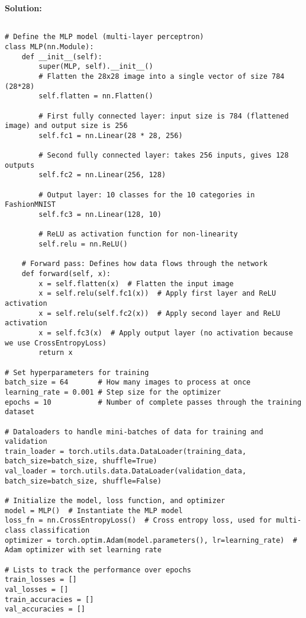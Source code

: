 \documentclass{article}
\newenvironment{solution}{\color{blue} \smallskip \textbf{Solution:}}{}
\begin{document}
\begin{solution}
\begin{verbatim}

# Define the MLP model (multi-layer perceptron)
class MLP(nn.Module):
    def __init__(self):
        super(MLP, self).__init__()
        # Flatten the 28x28 image into a single vector of size 784 (28*28)
        self.flatten = nn.Flatten()  
        
        # First fully connected layer: input size is 784 (flattened image) and output size is 256
        self.fc1 = nn.Linear(28 * 28, 256)  
        
        # Second fully connected layer: takes 256 inputs, gives 128 outputs
        self.fc2 = nn.Linear(256, 128)
        
        # Output layer: 10 classes for the 10 categories in FashionMNIST
        self.fc3 = nn.Linear(128, 10)  
        
        # ReLU as activation function for non-linearity
        self.relu = nn.ReLU()

    # Forward pass: Defines how data flows through the network
    def forward(self, x):
        x = self.flatten(x)  # Flatten the input image
        x = self.relu(self.fc1(x))  # Apply first layer and ReLU activation
        x = self.relu(self.fc2(x))  # Apply second layer and ReLU activation
        x = self.fc3(x)  # Apply output layer (no activation because we use CrossEntropyLoss)
        return x

# Set hyperparameters for training
batch_size = 64       # How many images to process at once
learning_rate = 0.001 # Step size for the optimizer
epochs = 10           # Number of complete passes through the training dataset

# Dataloaders to handle mini-batches of data for training and validation
train_loader = torch.utils.data.DataLoader(training_data, batch_size=batch_size, shuffle=True)
val_loader = torch.utils.data.DataLoader(validation_data, batch_size=batch_size, shuffle=False)

# Initialize the model, loss function, and optimizer
model = MLP()  # Instantiate the MLP model
loss_fn = nn.CrossEntropyLoss()  # Cross entropy loss, used for multi-class classification
optimizer = torch.optim.Adam(model.parameters(), lr=learning_rate)  # Adam optimizer with set learning rate

# Lists to track the performance over epochs
train_losses = []
val_losses = []
train_accuracies = []
val_accuracies = []


\end{verbatim}
\end{solution}
\end{document}
